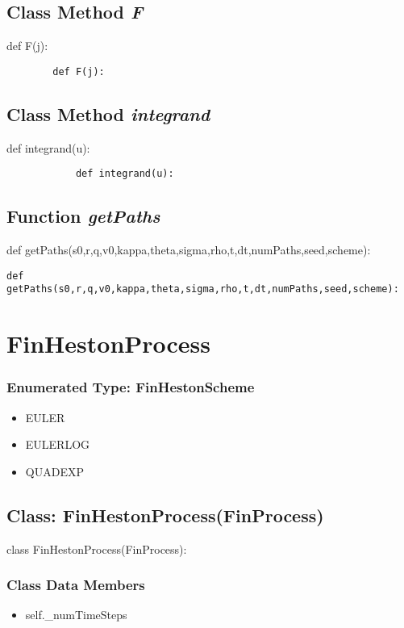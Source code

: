 \documentclass[twoside,11pt]{book}
\begin{document}
\subsection{Class Method {\it F}}
def F(j):

\begin{lstlisting}
        def F(j):
\end{lstlisting}

\subsection{Class Method {\it integrand}}
def integrand(u):

\begin{lstlisting}
            def integrand(u):
\end{lstlisting}

\subsection{Function {\it getPaths}}
def getPaths(s0,r,q,v0,kappa,theta,sigma,rho,t,dt,numPaths,seed,scheme):

\begin{lstlisting}
def getPaths(s0,r,q,v0,kappa,theta,sigma,rho,t,dt,numPaths,seed,scheme):
\end{lstlisting}

\newpage
\section{FinHestonProcess}

\subsubsection{Enumerated Type: FinHestonScheme}
\begin{itemize}
\item{EULER}
\item{EULERLOG}
\item{QUADEXP}
\end{itemize}

\subsection{Class: FinHestonProcess(FinProcess)}
class FinHestonProcess(FinProcess):

\subsubsection{Class Data Members}
\begin{itemize}
\item{self.\_numTimeSteps}
\end{itemize}
\end{document}
